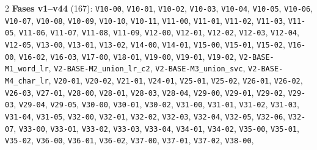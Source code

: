 \begin{multicols}{2}
\noindent\textbf{Fases v1--v44} (167): \texttt{V10-\allowbreak{}00}, \texttt{V10-\allowbreak{}01}, \texttt{V10-\allowbreak{}02}, \texttt{V10-\allowbreak{}03}, \texttt{V10-\allowbreak{}04}, \texttt{V10-\allowbreak{}05}, \texttt{V10-\allowbreak{}06}, \texttt{V10-\allowbreak{}07}, \texttt{V10-\allowbreak{}08}, \texttt{V10-\allowbreak{}09}, \texttt{V10-\allowbreak{}10}, \texttt{V10-\allowbreak{}11}, \texttt{V11-\allowbreak{}00}, \texttt{V11-\allowbreak{}01}, \texttt{V11-\allowbreak{}02}, \texttt{V11-\allowbreak{}03}, \texttt{V11-\allowbreak{}05}, \texttt{V11-\allowbreak{}06}, \texttt{V11-\allowbreak{}07}, \texttt{V11-\allowbreak{}08}, \texttt{V11-\allowbreak{}09}, \texttt{V12-\allowbreak{}00}, \texttt{V12-\allowbreak{}01}, \texttt{V12-\allowbreak{}02}, \texttt{V12-\allowbreak{}03}, \texttt{V12-\allowbreak{}04}, \texttt{V12-\allowbreak{}05}, \texttt{V13-\allowbreak{}00}, \texttt{V13-\allowbreak{}01}, \texttt{V13-\allowbreak{}02}, \texttt{V14-\allowbreak{}00}, \texttt{V14-\allowbreak{}01}, \texttt{V15-\allowbreak{}00}, \texttt{V15-\allowbreak{}01}, \texttt{V15-\allowbreak{}02}, \texttt{V16-\allowbreak{}00}, \texttt{V16-\allowbreak{}02}, \texttt{V16-\allowbreak{}03}, \texttt{V17-\allowbreak{}00}, \texttt{V18-\allowbreak{}01}, \texttt{V19-\allowbreak{}00}, \texttt{V19-\allowbreak{}01}, \texttt{V19-\allowbreak{}02}, \texttt{V2-\allowbreak{}BASE-\allowbreak{}M1\_\allowbreak{}word\_\allowbreak{}lr}, \texttt{V2-\allowbreak{}BASE-\allowbreak{}M2\_\allowbreak{}union\_\allowbreak{}lr\_\allowbreak{}c2}, \texttt{V2-\allowbreak{}BASE-\allowbreak{}M3\_\allowbreak{}union\_\allowbreak{}svc}, \texttt{V2-\allowbreak{}BASE-\allowbreak{}M4\_\allowbreak{}char\_\allowbreak{}lr}, \texttt{V20-\allowbreak{}01}, \texttt{V20-\allowbreak{}02}, \texttt{V21-\allowbreak{}01}, \texttt{V24-\allowbreak{}01}, \texttt{V25-\allowbreak{}01}, \texttt{V25-\allowbreak{}02}, \texttt{V26-\allowbreak{}01}, \texttt{V26-\allowbreak{}02}, \texttt{V26-\allowbreak{}03}, \texttt{V27-\allowbreak{}01}, \texttt{V28-\allowbreak{}00}, \texttt{V28-\allowbreak{}01}, \texttt{V28-\allowbreak{}03}, \texttt{V28-\allowbreak{}04}, \texttt{V29-\allowbreak{}00}, \texttt{V29-\allowbreak{}01}, \texttt{V29-\allowbreak{}02}, \texttt{V29-\allowbreak{}03}, \texttt{V29-\allowbreak{}04}, \texttt{V29-\allowbreak{}05}, \texttt{V30-\allowbreak{}00}, \texttt{V30-\allowbreak{}01}, \texttt{V30-\allowbreak{}02}, \texttt{V31-\allowbreak{}00}, \texttt{V31-\allowbreak{}01}, \texttt{V31-\allowbreak{}02}, \texttt{V31-\allowbreak{}03}, \texttt{V31-\allowbreak{}04}, \texttt{V31-\allowbreak{}05}, \texttt{V32-\allowbreak{}00}, \texttt{V32-\allowbreak{}01}, \texttt{V32-\allowbreak{}02}, \texttt{V32-\allowbreak{}03}, \texttt{V32-\allowbreak{}04}, \texttt{V32-\allowbreak{}05}, \texttt{V32-\allowbreak{}06}, \texttt{V32-\allowbreak{}07}, \texttt{V33-\allowbreak{}00}, \texttt{V33-\allowbreak{}01}, \texttt{V33-\allowbreak{}02}, \texttt{V33-\allowbreak{}03}, \texttt{V33-\allowbreak{}04}, \texttt{V34-\allowbreak{}01}, \texttt{V34-\allowbreak{}02}, \texttt{V35-\allowbreak{}00}, \texttt{V35-\allowbreak{}01}, \texttt{V35-\allowbreak{}02}, \texttt{V36-\allowbreak{}00}, \texttt{V36-\allowbreak{}01}, \texttt{V36-\allowbreak{}02}, \texttt{V37-\allowbreak{}00}, \texttt{V37-\allowbreak{}01}, \texttt{V37-\allowbreak{}02}, \texttt{V38-\allowbreak{}00}, 
\end{multicols}
